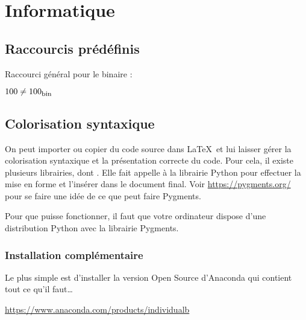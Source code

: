 \chapter{Informatique}





\section{Raccourcis prédéfinis}

Raccourci général pour le binaire :

\begin{LTXexample}[pos=o,width=.4]
	$100 \neq \binaire{100}$
\end{LTXexample}





\section{Colorisation syntaxique}

On peut importer ou copier du code source dans \LaTeX \ et lui laisser gérer la colorisation syntaxique et la présentation correcte du code. Pour cela, il existe plusieurs librairies, dont . Elle fait appelle à la librairie Python  pour effectuer la mise en forme et l'insérer dans le document final. Voir \href{https://pygments.org/}{https://pygments.org/} pour se faire une idée de ce que peut faire Pygments.

Pour que  puisse fonctionner, il faut que votre ordinateur dispose d'une distribution Python avec la librairie Pygments.



\subsection{Installation complémentaire}

Le plus simple est d'installer la version Open Source d'Anaconda qui contient tout ce qu'il faut\dots 
\begin{center}
	\href{https://www.anaconda.com/products/individual}{https://www.anaconda.com/products/individualb}
\end{center}




